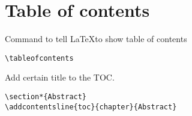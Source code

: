 
\chapter{Table of contents}

Command to tell \LaTeX to show table of contents
\begin{lstlisting}[language={[LaTeX]TeX}, caption=Add table of contents]
\tableofcontents
\end{lstlisting}

Add certain title to the TOC.
\begin{lstlisting}[language={[LaTeX]TeX}, caption=Add table of contents]
\section*{Abstract}
\addcontentsline{toc}{chapter}{Abstract}
\end{lstlisting}